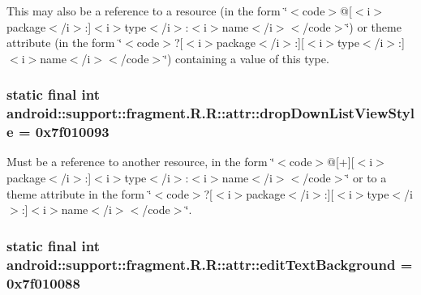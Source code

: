 This may also be a reference to a resource (in the form \char`\"{}$<$code$>$@\mbox{[}$<$i$>$package$<$/i$>$:\mbox{]}$<$i$>$type$<$/i$>$:$<$i$>$name$<$/i$>$$<$/code$>$\char`\"{}) or theme attribute (in the form \char`\"{}$<$code$>$?\mbox{[}$<$i$>$package$<$/i$>$:\mbox{]}\mbox{[}$<$i$>$type$<$/i$>$:\mbox{]}$<$i$>$name$<$/i$>$$<$/code$>$\char`\"{}) containing a value of this type. \hypertarget{classandroid_1_1support_1_1fragment_1_1_r_1_1attr_38c225b1c9017950d1592047ebe7eee9}{
\subsubsection[{dropDownListViewStyle}]{\setlength{\rightskip}{0pt plus 5cm}static final int android::support::fragment.R.R::attr::dropDownListViewStyle = 0x7f010093}}
\label{classandroid_1_1support_1_1fragment_1_1_r_1_1attr_38c225b1c9017950d1592047ebe7eee9}


Must be a reference to another resource, in the form \char`\"{}$<$code$>$@\mbox{[}+\mbox{]}\mbox{[}$<$i$>$package$<$/i$>$:\mbox{]}$<$i$>$type$<$/i$>$:$<$i$>$name$<$/i$>$$<$/code$>$\char`\"{} or to a theme attribute in the form \char`\"{}$<$code$>$?\mbox{[}$<$i$>$package$<$/i$>$:\mbox{]}\mbox{[}$<$i$>$type$<$/i$>$:\mbox{]}$<$i$>$name$<$/i$>$$<$/code$>$\char`\"{}. \hypertarget{classandroid_1_1support_1_1fragment_1_1_r_1_1attr_742dc323a6de6545f9d9a396b899622c}{
\subsubsection[{editTextBackground}]{\setlength{\rightskip}{0pt plus 5cm}static final int android::support::fragment.R.R::attr::editTextBackground = 0x7f010088}}
\label{classandroid_1_1support_1_1fragment_1_1_r_1_1attr_742dc323a6de6545f9d9a396b899622c}


